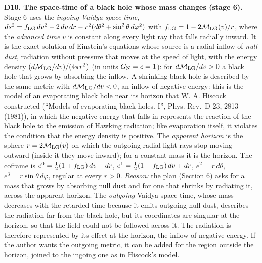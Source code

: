 \documentclass[
  10pt,
]{article}
\begin{document}
\textbf{D10. The space-time of a black hole whose mass changes (stage
6).} Stage 6 uses the \emph{ingoing Vaidya space-time},
\(ds^2=f_{\rm LG}\,dv^2-2\,dv\,dr-r^2(d\theta^2+\sin^2\theta\,d\varphi^2)\)
with \(f_{\rm LG}=1-2\mathcal M_{\rm LG}(v)/r\), where the
\emph{advanced time} \(v\) is constant along every light ray that falls
radially inward. It is the exact solution of Einstein's equations whose
source is a radial inflow of \emph{null dust}, radiation without
pressure that moves at the speed of light, with the energy density
\((d\mathcal M_{\rm LG}/dv)/(4\pi r^2)\) (in units \(G_{\rm N}=c=1\)):
for \(d\mathcal M_{\rm LG}/dv>0\) a black hole that grows by absorbing
the inflow. A shrinking black hole is described by the same metric with
\(d\mathcal M_{\rm LG}/dv<0\), an inflow of negative energy: this is the
model of an evaporating black hole near its horizon that W. A. Hiscock
constructed (``Models of evaporating black holes. I'', Phys. Rev.~D 23,
2813 (1981)), in which the negative energy that falls in represents the
reaction of the black hole to the emission of Hawking radiation; like
evaporation itself, it violates the condition that the energy density is
positive. The \emph{apparent horizon} is the sphere
\(r=2\mathcal M_{\rm LG}(v)\) on which the outgoing radial light rays
stop moving outward (inside it they move inward); for a constant mass it
is the horizon. The coframe is \(e^0=\tfrac12(1+f_{\rm LG})\,dv-dr\),
\(e^1=\tfrac12(1-f_{\rm LG})\,dv+dr\), \(e^2=r\,d\theta\),
\(e^3=r\sin\theta\,d\varphi\), regular at every \(r>0\). \emph{Reason:}
the plan (Section 6) asks for a mass that grows by absorbing null dust
and for one that shrinks by radiating it, across the apparent horizon.
The \emph{outgoing} Vaidya space-time, whose mass decreases with the
retarded time because it emits outgoing null dust, describes the
radiation far from the black hole, but its coordinates are singular at
the horizon, so that the field could not be followed across it. The
radiation is therefore represented by its effect at the horizon, the
inflow of negative energy. If the author wants the outgoing metric, it
can be added for the region outside the horizon, joined to the ingoing
one as in Hiscock's model.
\end{document}

